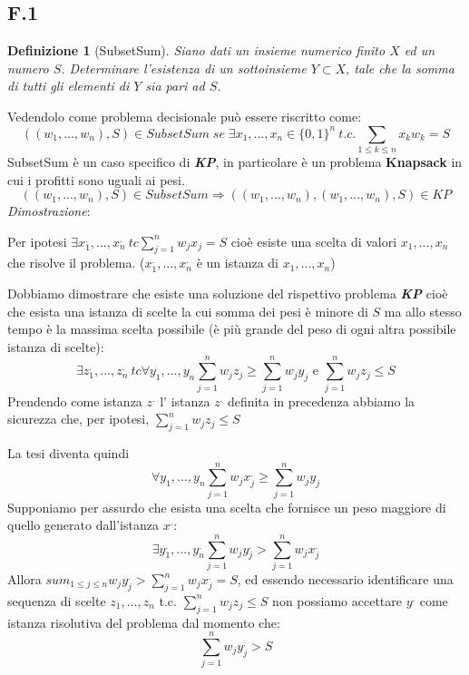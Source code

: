 \documentclass[a4paper]{article}
\newtheorem*{definition}{Definizione}
\newenvironment{dimostrazione}{\textit{Dimostrazione}:\begin{adjustwidth}{1cm}{}}{\end{adjustwidth}}
\newcommand{\imp}[1]{\textbf{\textit{#1}}}
\begin{document}
\subsection{F.1}
\begin{definition}[SubsetSum]
	Siano dati un insieme numerico finito $X$ ed un numero $S$. Determinare l’esistenza di un sottoinsieme $Y \subset X$, tale che la somma di tutti gli elementi di $Y$ sia pari ad $S$.
\end{definition}
	Vedendolo come problema decisionale può essere riscritto come:
	$$((w_1,...,w_n),S) \in SubsetSum \; se \; \exists x_1, ... , x_n \in \{0,1\}^n \: t.c. \sum_{1 \leq k \leq n} x_kw_k = S$$
	SubsetSum è un caso specifico di \imp{KP}, in particolare è un problema \textbf{Knapsack} in cui i profitti sono uguali ai pesi.
	$$((w_1,...,w_n),S) \in SubsetSum \Rightarrow ((w_1,...,w_n),(w_1,...,w_n),S) \in KP$$
\begin{dimostrazione}
	Per ipotesi $\exists x_1^., ..., x_n^. \: tc \sum_{j=1}^n w_jx_j = S$ cioè esiste una scelta di valori $x_1,...,x_n$ che risolve il problema. ($x_1^., ..., x_n^.$ è un istanza di $x_1, ..., x_n$)

	Dobbiamo dimostrare che esiste una soluzione del rispettivo problema \imp{KP} cioè che esista una istanza di scelte la cui somma dei pesi è minore di $S$ ma allo stesso tempo è la massima scelta possibile (è più grande del peso di ogni altra possibile istanza di scelte):
	$$ \exists z_1^., ..., z_n^. \: tc \forall y_1,...,y_n \sum_{j=1}^n w_jz_j \geq \sum_{j=1}^n w_jy_j \text{ e } \sum_{j=1}^n w_jz_j \leq S$$
	Prendendo come istanza $z^.$ l' istanza $z^.$ definita in precedenza abbiamo la sicurezza che, per ipotesi, $\sum_{j=1}^n w_jz_j \leq S$

	La tesi diventa quindi $$ \forall y_1,...,y_n \sum_{j=1}^n w_jx_j^. \geq \sum_{j=1}^n w_jy_j$$
Supponiamo per assurdo che esista una scelta che fornisce un peso maggiore di quello generato dall'istanza $x^.$:$$\exists y_1^.,...,y_n^. \sum_{j=1}^n w_jy_j^. > \sum_{j=1}^n w_jx_j^.$$
Allora $sum_{1 \leq j \leq n} w_jy_j^. > \sum_{j=1}^n w_jx_j^. = S $, ed essendo necessario identificare una sequenza di scelte $z_1,...,z_n$ t.c. $\sum_{j=1}^n w_jz_j \leq S$ non possiamo accettare $y^.$ come istanza risolutiva del problema dal momento che:
$$\sum_{j=1}^n w_jy_j^. > S $$
\end{dimostrazione}
\end{document}
